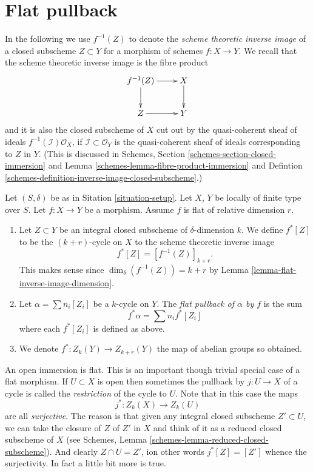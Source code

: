 \section{Flat pullback}
\label{section-flat-pullback}

\noindent
In the following we use $f^{-1}(Z)$ to denote the
{\it scheme theoretic inverse image} of a closed subscheme
$Z \subset Y$ for a morphism of schemes $f : X \to Y$.
We recall that the scheme theoretic inverse image is the fibre product
$$
\xymatrix{
f^{-1}(Z) \ar[r] \ar[d] & X \ar[d] \\
Z \ar[r] & Y
}
$$
and it is also the closed subscheme of $X$ cut out by the
quasi-coherent sheaf of ideals $f^{-1}(\mathcal{I})\mathcal{O}_X$, if
$\mathcal{I} \subset \mathcal{O}_Y$ is the quasi-coherent sheaf of ideals
corresponding to $Z$ in $Y$.
(This is discussed in
Schemes, Section \ref{schemes-section-closed-immersion} and
Lemma \ref{schemes-lemma-fibre-product-immersion}
and Defintion \ref{schemes-definition-inverse-image-closed-subscheme}.)

\begin{definition}
\label{definition-flat-pullback}
Let $(S, \delta)$ be as in Sitation \ref{situation-setup}.
Let $X$, $Y$ be locally of finite type over $S$.
Let $f : X \to Y$ be a morphism.
Assume $f$ is flat of relative dimension $r$.
\begin{enumerate}
\item Let $Z \subset Y$ be an integral closed subscheme of
$\delta$-dimension $k$. We define $f^*[Z]$ to be the
$(k+r)$-cycle on $X$ to the scheme theoretic inverse image
$$
f^*[Z] = [f^{-1}(Z)]_{k+r}.
$$
This makes sense since $\dim_\delta(f^{-1}(Z)) = k + r$
by Lemma \ref{lemma-flat-inverse-image-dimension}.
\item Let $\alpha = \sum n_i [Z_i]$ be
a $k$-cycle on $Y$. The {\it flat pullback of $\alpha$ by $f$}
is the sum
$$
f^* \alpha = \sum n_i f^*[Z_i]
$$
where each $f^*[Z_i]$ is defined as above.
\item We denote $f^* : Z_k(Y) \to Z_{k + r}(Y)$ the map of abelian
groups so obtained.
\end{enumerate}
\end{definition}

\noindent
An open immersion is flat. This is an important though trivial special
case of a flat morphism. If $U \subset X$ is open then sometimes the
pullback by $j : U \to X$ of a cycle is called the {\it restriction} of the
cycle to $U$. Note that in this case the maps
$$
j^* : Z_k(X) \longrightarrow Z_k(U)
$$
are all {\it surjective}. The reason is that given any integral closed
subscheme $Z' \subset U$, we can take the closure of $Z$ of $Z'$ in $X$
and think of it as a reduced closed subscheme of $X$ (see
Schemes, Lemma \ref{schemes-lemma-reduced-closed-subscheme}).
And clearly $Z \cap U = Z'$, ion other words
$j^*[Z] = [Z']$ whence the surjectivity. In fact a little bit more
is true.

